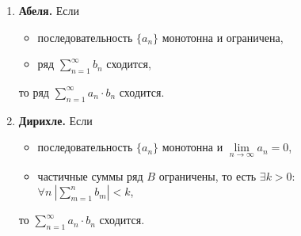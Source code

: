 \begin{theorem}\leavevmode
    \begin{enumerate}
        \item \textbf{Абеля.} Если \begin{itemize}
                  \item последовательность $\{a_n\}$ монотонна и ограничена,
                  \item ряд $\sum_{n=1}^{\infty} b_n$ сходится,
              \end{itemize}
              то ряд $\sum_{n=1}^{\infty}a_n \cdot b_n$ сходится.

        \item \textbf{Дирихле.} Если \begin{itemize}
                  \item последовательность $\{a_n\}$ монотонна и $\underset{n\rightarrow\infty}{\lim}a_n = 0$,
                  \item частичные суммы ряд $B$ ограничены, то есть $\exists k > 0: $ \\ $ \forall n \ \left|\sum_{m=1}^{n} b_m\right|< k$,
              \end{itemize}
              то $\sum_{n=1}^{\infty}a_n \cdot b_n$ сходится.
    \end{enumerate}
\end{theorem}

